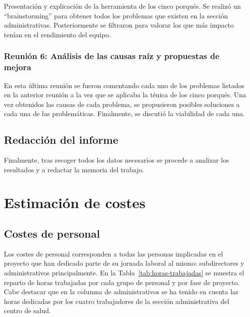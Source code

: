 Presentación y explicación de la herramienta de los cinco porqués.
Se realizó un ``brainstorming'' para obtener todos los problemas que existen en la sección administrativas.
Posteriormente se filtraron para valorar los que más impacto tenían en el rendimiento del equipo.

\subsubsection{Reunión 6: Análisis de las causas raíz y propuestas de mejora}

En esta última reunión se fueron comentando cada uno de los problemas listados en la anterior reunión a la vez que se aplicaba la ténica de los cinco porqués.
Una vez obtenidos las causas de cada problema, se propusieron posibles soluciones a cada una de las problemáticas. Finalmente, se discutió la viabilidad de cada una.

\subsection{Redacción del informe}

Finalmente, tras recoger todos los datos necesarios se procede a analizar los resultados y a redactar la memoria del trabajo.

\section{Estimación de costes}


\subsection{Costes de personal}

Los costes de personal corresponden a todas las personas implicadas en el proyecto que han dedicado parte de su jornada laboral al mismo: subdirectores y administrativos principalmente.
En la Tabla~\ref{tab:horas-trabajadas} se muestra el reparto de horas trabajadas por cada grupo de personal y por fase de proyecto.
Cabe destacar que en la columna de administrativos se ha tenido en cuenta las horas dedicadas por los cuatro trabajadores de la sección administrativa del centro de salud.

